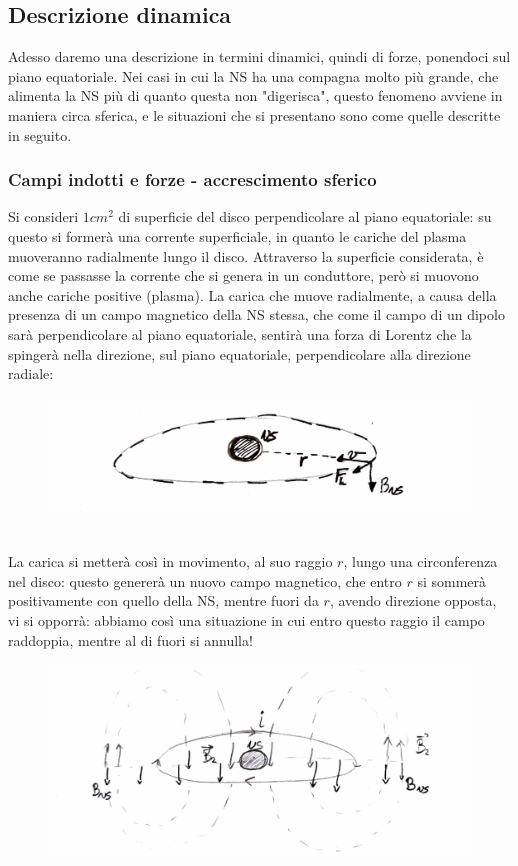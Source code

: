 \subsection{Descrizione dinamica}
Adesso daremo una descrizione in termini dinamici, quindi di forze, ponendoci sul piano equatoriale.
Nei casi in cui la NS ha una compagna molto più grande, che alimenta la NS più di quanto questa non "digerisca", questo fenomeno avviene in maniera circa sferica, e le situazioni che si presentano sono come quelle descritte in seguito.

\subsubsection{Campi indotti e forze - accrescimento sferico}
Si consideri $1cm^2$ di superficie del disco perpendicolare al piano equatoriale: su questo si formerà una corrente superficiale, in quanto le cariche del plasma muoveranno radialmente lungo il disco.
Attraverso la superficie considerata, è come se passasse la corrente che si genera in un conduttore, però si muovono anche cariche positive (plasma).
La carica che muove radialmente, a causa della presenza di un campo magnetico della NS stessa, che come il campo di un dipolo sarà perpendicolare al piano equatoriale, sentirà una forza di Lorentz che la spingerà nella direzione, sul piano equatoriale, perpendicolare alla direzione radiale:
\begin{figure}[h!]
    \centering
    \includegraphics[width=0.65\linewidth]{Immagini/carica in orbita fase 2.pdf}
    \label{fig: carica in orbita fase 1}
\end{figure}\\
La carica si metterà così in movimento, al suo raggio $r$, lungo una circonferenza nel disco: questo genererà un nuovo campo magnetico, che entro $r$ si sommerà positivamente con quello della NS, mentre fuori da $r$, avendo direzione opposta, vi si opporrà:
abbiamo così una situazione in cui entro questo raggio il campo raddoppia, mentre al di fuori si annulla!
\begin{figure}[h!]
    \centering
    \includegraphics[width=0.65\linewidth]{Immagini/carica in orbita fase 1 .pdf}
    \label{fig: carica in orbita fase 2}
\end{figure}\\
